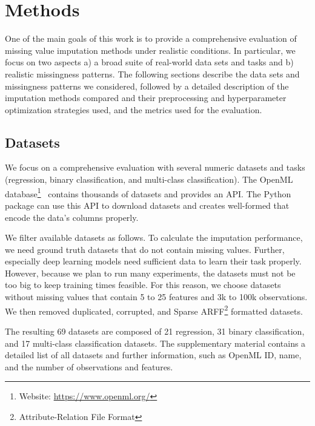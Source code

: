 
\section{Methods}
\label{sec:methods}
%
One of the main goals of this work is to provide a comprehensive evaluation of missing value imputation methods under realistic conditions. In particular, we focus on two aspects a) a broad suite of real-world data sets and tasks and b) realistic missingness patterns. The following sections describe the data sets and missingness patterns we considered, followed by a detailed description of the imputation methods compared and their preprocessing and hyperparameter optimization strategies used, and the metrics used for the evaluation.

\subsection{Datasets}
\label{sec:datasets}
%
We focus on a comprehensive evaluation with several numeric datasets and tasks (regression, binary classification, and multi-class classification). The OpenML database\footnote{Website: \url{https://www.openml.org/}}~\citep{OpenML2013} contains thousands of datasets and provides an API. The Python package  \citep{scikit-learn} can use this API to download datasets and creates well-formed  that encode the data's columns properly.

We filter available datasets as follows. To calculate the imputation performance, we need ground truth datasets that do not contain missing values. Further, especially deep learning models need sufficient data to learn their task properly. However, because we plan to run many experiments, the datasets must not be too big to keep training times feasible. For this reason, we choose datasets without missing values that contain 5 to 25 features and 3k to 100k observations. We then removed duplicated, corrupted, and Sparse ARFF\footnote{Attribute-Relation File Format} formatted datasets.

The resulting 69 datasets are composed of 21 regression, 31 binary classification, and 17 multi-class classification datasets. The supplementary material contains a detailed list of all datasets and further information, such as OpenML ID, name, and the number of observations and features.


